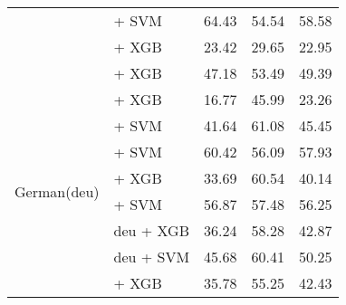 \begin{longtable}{llccc}
                                          & \citep{zpoint-large-embedding-zh} + SVM                                & 64.43                                & 54.54              & 58.58             \\
                                          & \citep{all-MiniLM-L12-v2} + XGB                                        & 23.42                                & 29.65              & 22.95             \\
                                          & \citep{sturua2024jinaembeddingsv3multilingualembeddingstask} + XGB     & 47.18                                & 53.49              & 49.39             \\

    \midrule
    \multirow{11}{*}{German(deu)}         & \citep{all-MiniLM-L12-v2}  + XGB                                       & 16.77                                & 45.99              & 23.26             \\
                                          & \citep{heinz2023e5basestsende} + SVM                                   & 41.64                                & 61.08              & 45.45             \\
                                          & \citep{wang2024multilingual} + SVM                                     & 60.42                                & 56.09              & 57.93             \\
                                          & \citep{chan2020germanslanguagemodel} + XGB                             & 33.69                                & 60.54              & 40.14             \\
                                          & \citep{chibb2023germansemanticsts} + SVM                               & 56.87                                & 57.48              & 56.25             \\
                                          & \citep{mohr2024multi} deu + XGB                                        & 36.24                                & 58.28              & 42.87             \\
                                          & \citep{mohr2024multi} deu + SVM                                        & 45.68                                & 60.41              & 50.25             \\
                                          & \citep{sturua2024jinaembeddingsv3multilingualembeddingstask} + XGB     & 35.78                                & 55.25              & 42.43             \\

\end{longtable}
